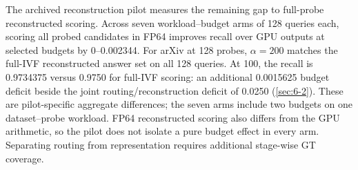 The archived reconstruction pilot measures the remaining gap to
full-probe reconstructed scoring.
Across seven workload--budget arms of 128 queries each, scoring all
probed candidates in FP64 improves recall over GPU outputs at selected budgets by
0--0.002344. For arXiv at 128 probes, $\alpha=200$ matches the full-IVF
reconstructed answer set on all 128 queries. At 100, the recall is
0.9734375 versus 0.9750 for full-IVF scoring: an additional 0.0015625
budget deficit beside the joint routing/reconstruction deficit of
0.0250 (\cref{sec:6-2}). These are pilot-specific aggregate differences;
the seven arms include two budgets on one dataset--probe workload.
FP64 reconstructed scoring also differs from the GPU arithmetic, so the
pilot does not isolate a pure budget effect in every arm. Separating
routing from representation requires additional stage-wise GT coverage.
